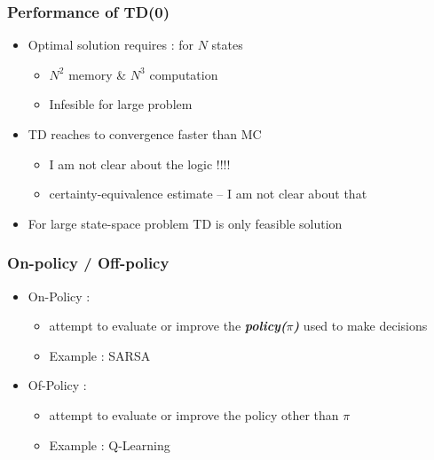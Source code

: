 \documentclass{beamer} %
\begin{document}
\begin{frame}
\frametitle{Performance of TD(0)}
\begin{itemize}
	
	\item Optimal solution requires : for $N$ states 
		\begin{itemize}
			\item $N^2$ memory \& $N^3$ computation
			\item Infesible for large problem
		\end{itemize}
	\item TD reaches to convergence faster than MC
		\begin{itemize}
			\item I am not clear about the logic !!!!
			\item certainty-equivalence estimate   -- I am not clear about that
		\end{itemize}
	\item For large state-space problem TD is only feasible solution
\end{itemize}

\end{frame}


\begin{frame}
\frametitle{On-policy / Off-policy}
\begin{itemize}
	\item On-Policy : 
	\begin{itemize}
		\item attempt to evaluate or improve the \textbf{\textit{policy($\pi $)}} used to make decisions
		\item Example :  SARSA
	\end{itemize}
	\item Of-Policy : 
	\begin{itemize}
		\item attempt to evaluate or improve the policy other than $\pi $
		\item Example :  Q-Learning
	\end{itemize}
\end{itemize}

\end{frame}
\end{document}
